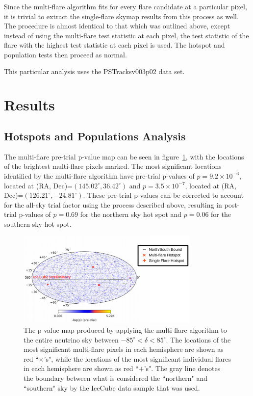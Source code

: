 Since the multi-flare algorithm fits for every flare candidate at a particular pixel, it is trivial to extract the single-flare skymap results from this process as well. The procedure is almost identical to that which was outlined above, except instead of using the multi-flare test statistic at each pixel, the test statistic of the flare with the highest test statistic at each pixel is used. The hotspot and population tests then proceed as normal.

This particular analysis uses the PSTracksv003p02 data set.

\section{Results}
\subsection{Hotspots and Populations Analysis}
The multi-flare pre-trial p-value map can be seen in figure~\ref{fig:mfskymap}, with the locations of the brightest multi-flare pixels marked. The most significant locations identified by the multi-flare algorithm have pre-trial p-values of $p=9.2\times10^{-6}$, located at (RA, Dec)=$(145.02^{\circ}, 36.42^{\circ})$ and $p=3.5\times10^{-7}$, located at (RA, Dec)=$(126.21^{\circ}, -24.81^{\circ})$. These pre-trial p-values can be corrected to account for the all-sky trial factor using the process described above, resulting in post-trial p-values of $p=0.69$ for the northern sky hot spot and $p=0.06$ for the southern sky hot spot.

\begin{figure}[h]
\centering
\includegraphics[width=0.8\textwidth]{figs/skymap_withlabels.png}
\caption{The p-value map produced by applying the multi-flare algorithm to the entire neutrino sky between $-85^{\circ}<\delta<85^{\circ}$. The locations of the most significant multi-flare pixels in each hemisphere are shown as red ``$\times$'s", while the locations of the most significant individual flares in each hemisphere are shown as red ``$+$'s". The gray line denotes the boundary between what is considered the ``northern" and ``southern" sky by the IceCube data sample that was used. }
\label{fig:mfskymap}
\end{figure}

